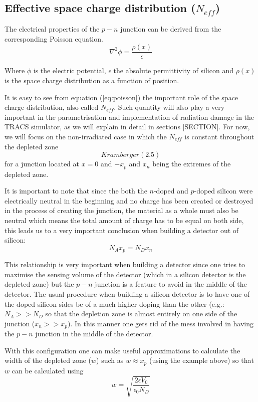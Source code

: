 \subsection{Effective space charge distribution ($N_{eff}$)} 

The electrical properties of the $p-n$ junction can be derived from the corresponding Poisson equation. 
\begin{equation}
\nabla^2 \phi = \frac{\rho(x)}{\epsilon} 
\label{eq:poisson}
\end{equation}

Where $\phi$ is the electric potential, $\epsilon$ the absolute permittivity of silicon and $\rho(x)$ is the space charge distribution as a function of position.

It is easy to see from equation (\ref{eq:poisson}) the important role of the space charge distribution, also called $N_{eff}$. Such quantity will also play a very important in the parametrisation and implementation of radiation damage in the TRACS simulator, as we will explain in detail in sections [SECTION]. For now, we will focus on the non-irradiated case in which the $N_{eff}$ is constant throughout the depleted zone \[ Kramberger (2.5)\] for a junction located at $x=0$ and $-x_p$ and $x_n$ being the extremes of the depleted zone.

It is important to note that since the both the $n$-doped and $p$-doped silicon were electrically neutral in the beginning and no charge has been created or destroyed in the process of creating the junction, the material as a whole must also be neutral which means the total amount of charge has to be equal on both side, this leads us to a very important conclusion when building a detector out of silicon: \[N_A x_p = N_D x_n\] 

This relationship is very important when building a detector since one tries to maximise the sensing volume of the detector (which in a silicon detector is the depleted zone) but the $p-n$ junction is a feature to avoid in the middle of the detector. The usual procedure when building a silicon detector is to have one of the doped silicon sides be of a much higher doping than the other (e.g.: $N_A >> N_D$  so that the depletion zone is almost entirely on one side of the junction ($x_n >> x_p$). In this manner one gets rid of the mess involved in having the $p-n$ junction in the middle of the detector.

With this configuration one can make useful approximations to calculate the width of the depleted zone ($w$) such as $w \approx x_p$  (using the example above) so that $w$ can be calculated using 
\begin{equation}
w = \sqrt{\frac{2\epsilon V_0}{\epsilon_0 N_D}}
\label{eq:width}
\end{equation}

